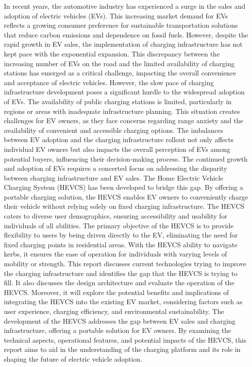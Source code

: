 \documentclass [12pt]{article}
\begin{document}
In recent years, the automotive industry has experienced a surge in the sales and adoption of electric vehicles (EVs). This increasing market demand for EVs reflects a growing consumer preference for sustainable transportation solutions that reduce carbon emissions and dependence on fossil fuels. However, despite the rapid growth in EV sales, the implementation of charging infrastructure has not kept pace with the exponential expansion. This discrepancy between the increasing number of EVs on the road and the limited availability of charging stations has emerged as a critical challenge, impacting the overall convenience and acceptance of electric vehicles.
However, the slow pace of charging infrastructure development poses a significant hurdle to the widespread adoption of EVs. The availability of public charging stations is limited, particularly in regions or areas with inadequate infrastructure planning. This situation creates challenges for EV owners, as they face concerns regarding range anxiety and the availability of convenient and accessible charging options. The imbalances between EV adoption and the charging infrastructure rollout not only affects individual EV owners but also impacts the overall perception of EVs among potential buyers, influencing their decision-making process.
The continued growth and adoption of EVs requires a concerted focus on addressing the disparity between charging infrastructure and EV sales. The Home Electric Vehicle Charging System (HEVCS) has been developed to bridge this gap. By offering a portable charging solution, the HEVCS enables EV owners to conveniently charge their vehicle without relying solely on fixed charging infrastructure. The HEVCS caters to diverse user demographics, ensuring accessibility and usability for individuals of all abilities.
The primary objective of the HEVCS is to provide flexibility to users by being driven directly to the EV, eliminating the need for fixed charging points in residential areas. With the HEVCS ability to navigate kerbs, it ensures the ease of operation for individuals with varying levels of mobility or strength.
This report discusses current technologies trying to improve the charging infrastructure and identifies the gap that the HEVCS is trying to fill. It also discusses the design architecture and evaluate the operation of the HEVCS. Moreover, it will explore the potential benefits and implications of integrating the HEVCS into the existing EV market, considering factors such as user experience, charging efficiency, and environmental sustainability.
The development of the HEVCS addresses the gap between EV sales and charging infrastructure, offering a portable solution for EV owners. By examining the technical aspects, operational features, and potential impacts of the HEVCS, this report aims to aid in the understanding of the charging platform and its role in shaping the future of electric vehicle adoption.
\end{document}
